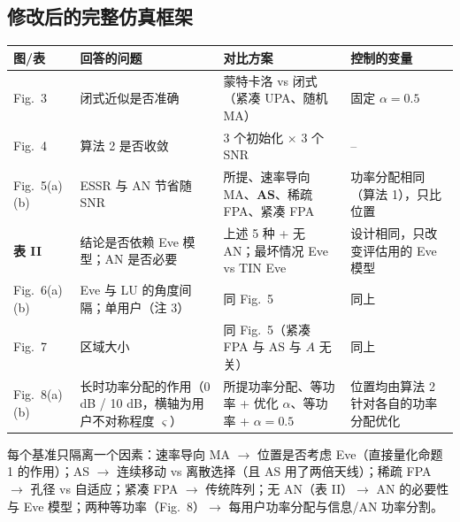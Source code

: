 \documentclass[11pt,a4paper]{ctexart}
\begin{document}
\subsection{修改后的完整仿真框架}
\begin{longtable}{p{2.0cm}p{3.4cm}p{4.9cm}p{4.6cm}}
\toprule
图/表 & 回答的问题 & 对比方案 & 控制的变量 \\ \midrule
Fig.~3 & 闭式近似是否准确 & 蒙特卡洛 vs 闭式（紧凑 UPA、随机 MA） & 固定 $\alpha=0.5$ \\
Fig.~4 & 算法 2 是否收敛 & 3 个初始化 $\times$ 3 个 SNR & -- \\
Fig.~5(a)(b) & ESSR 与 AN 节省随 SNR & 所提、速率导向 MA、\textbf{AS}、稀疏 FPA、紧凑 FPA & 功率分配相同（算法 1），只比位置 \\
\textbf{表 II} & 结论是否依赖 Eve 模型；AN 是否必要 & 上述 5 种 + 无 AN；最坏情况 Eve vs TIN Eve & 设计相同，只改变评估用的 Eve 模型 \\
Fig.~6(a)(b) & Eve 与 LU 的角度间隔；单用户（注 3） & 同 Fig.~5 & 同上 \\
Fig.~7 & 区域大小 & 同 Fig.~5（紧凑 FPA 与 AS 与 $A$ 无关） & 同上 \\
Fig.~8(a)(b) & 长时功率分配的作用（0 dB / 10 dB，横轴为用户不对称程度 $\varsigma$） & 所提功率分配、等功率 + 优化 $\alpha$、等功率 + $\alpha=0.5$ & 位置均由算法 2 针对各自的功率分配优化 \\
\bottomrule
\end{longtable}
每个基准只隔离一个因素：速率导向 MA $\to$ 位置是否考虑 Eve（直接量化命题 1 的作用）；AS $\to$ 连续移动 vs 离散选择（且 AS 用了两倍天线）；稀疏 FPA $\to$ 孔径 vs 自适应；紧凑 FPA $\to$ 传统阵列；无 AN（表 II）$\to$ AN 的必要性与 Eve 模型；两种等功率（Fig.~8）$\to$ 每用户功率分配与信息/AN 功率分割。
\end{document}
